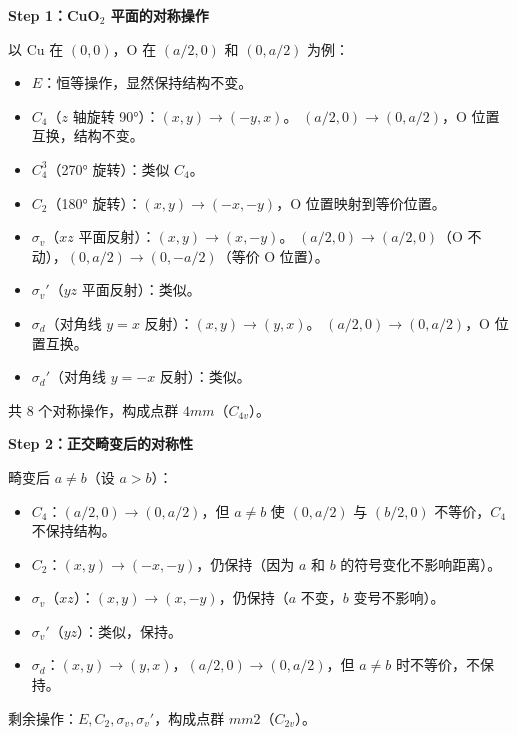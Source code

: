 \begin{derivationbox}
\textbf{Step 1：CuO$_2$ 平面的对称操作}

以 Cu 在 $(0,0)$，O 在 $(a/2,0)$ 和 $(0,a/2)$ 为例：

\begin{itemize}
    \item $E$：恒等操作，显然保持结构不变。
    \item $C_4$（$z$ 轴旋转 90°）：$(x,y)\to(-y,x)$。
    $(a/2,0)\to(0,a/2)$，O 位置互换，结构不变。
    \item $C_4^3$（270° 旋转）：类似 $C_4$。
    \item $C_2$（180° 旋转）：$(x,y)\to(-x,-y)$，O 位置映射到等价位置。
    \item $\sigma_v$（$xz$ 平面反射）：$(x,y)\to(x,-y)$。
    $(a/2,0)\to(a/2,0)$（O 不动），$(0,a/2)\to(0,-a/2)$（等价 O 位置）。
    \item $\sigma_v'$（$yz$ 平面反射）：类似。
    \item $\sigma_d$（对角线 $y=x$ 反射）：$(x,y)\to(y,x)$。
    $(a/2,0)\to(0,a/2)$，O 位置互换。
    \item $\sigma_d'$（对角线 $y=-x$ 反射）：类似。
\end{itemize}

共 8 个对称操作，构成点群 $4mm$（$C_{4v}$）。

\textbf{Step 2：正交畸变后的对称性}

畸变后 $a\neq b$（设 $a>b$）：
\begin{itemize}
    \item $C_4$：$(a/2,0)\to(0,a/2)$，但 $a\neq b$ 使 $(0,a/2)$ 与 $(b/2,0)$ 不等价，$C_4$ 不保持结构。
    \item $C_2$：$(x,y)\to(-x,-y)$，仍保持（因为 $a$ 和 $b$ 的符号变化不影响距离）。
    \item $\sigma_v$（$xz$）：$(x,y)\to(x,-y)$，仍保持（$a$ 不变，$b$ 变号不影响）。
    \item $\sigma_v'$（$yz$）：类似，保持。
    \item $\sigma_d$：$(x,y)\to(y,x)$，$(a/2,0)\to(0,a/2)$，但 $a\neq b$ 时不等价，不保持。
\end{itemize}

剩余操作：$E, C_2, \sigma_v, \sigma_v'$，构成点群 $mm2$（$C_{2v}$）。
\end{derivationbox}

\vspace{1em}
